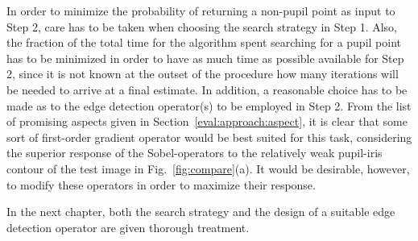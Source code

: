 In order to minimize the probability of returning a non-pupil point as
input to Step 2, care has to be taken when choosing the search
strategy in Step 1.  Also, the fraction of the total time for the
algorithm spent searching for a pupil point has to be minimized in
order to have as much time as possible available for Step 2, since it
is not known at the outset of the procedure how many iterations will
be needed to arrive at a final estimate.  In addition, a reasonable
choice has to be made as to the edge detection operator(s) to be
employed in Step 2.  From the list of promising aspects given in
Section~\ref{eval:approach:aspect}, it is clear that some sort of
first-order gradient operator would be best suited for this task,
considering the superior response of the Sobel-operators to the
relatively weak pupil-iris contour of the test image in
Fig.~\ref{fig:compare}(a).  It would be desirable, however, to modify
these operators in order to maximize their response.

In the next chapter, both the search strategy and the design of a
suitable edge detection operator are given thorough treatment.
